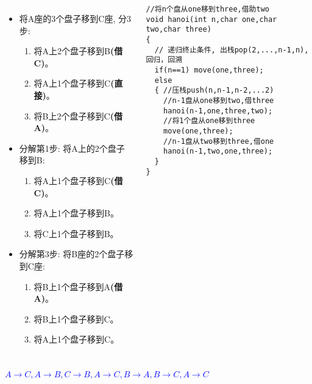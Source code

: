 \begin{frame}%
\vspace{-0.4cm}
\begin{columns}[T]
	\begin{itemize}
		\small
		\item 将A座的3个盘子移到C座, 分3步:
		\begin{enumerate}
			\scriptsize
			\item 将A上2个盘子移到B\textbf{(借C)}。
			\item 将A上1个盘子移到C\textbf{(直接)}。
			\item 将B上2个盘子移到C\textbf{(借A)}。
		\end{enumerate}
		\item 分解第1步: 将A上的2个盘子移到B:
		\begin{enumerate}\scriptsize
			\item 将A上1个盘子移到C\textbf{(借C)}。
			\item 将A上1个盘子移到B。
			\item 将C上1个盘子移到B。
		\end{enumerate}
		\item 分解第3步: 将B座的2个盘子移到C座:
		\begin{enumerate}\scriptsize
			\item 将B上1个盘子移到A\textbf{(借A)}。
			\item 将B上1个盘子移到C。
			\item 将A上1个盘子移到C。
		\end{enumerate}
	\end{itemize}
\begin{lstlisting}[frame=leftline]
//将n个盘从one移到three,借助two
void hanoi(int n,char one,char two,char three)
{
  // 递归终止条件, 出栈pop(2,...,n-1,n), 回归，回溯
  if(n==1) move(one,three); 
  else
  { //压栈push(n,n-1,n-2,...2)
    //n-1盘从one移到two,借three
    hanoi(n-1,one,three,two); 
    //将1个盘从one移到three
    move(one,three); 
    //n-1盘从two移到three,借one
    hanoi(n-1,two,one,three);
  }
}
\end{lstlisting}
\end{columns}
\textcolor{blue}{$A\to C,A\to B,C\to B,A\to C,B\to A,B\to C,A\to C$}\\
\end{frame}

